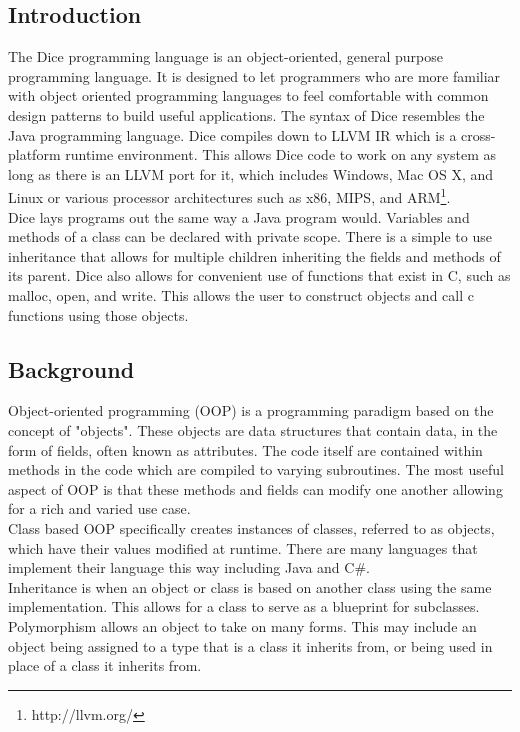 \begin{homeworkProblem}
	\chapter{Introduction}
	The Dice programming language is an object-oriented, general purpose programming language. It is designed to let programmers who are more familiar with object oriented programming languages to feel comfortable with common design patterns to build useful applications. The syntax of Dice resembles the Java programming language. Dice compiles down to LLVM IR which is a cross-platform runtime environment. This allows Dice code to work on any system as long as there is an LLVM port for it, which includes Windows, Mac OS X, and Linux or various processor architectures such as x86, MIPS, and ARM\footnote{http://llvm.org/}.\\
	
	Dice lays programs out the same way a Java program would. Variables and methods of a class can be declared with private scope. There is a simple to use inheritance that allows for multiple children inheriting the fields and methods of its parent. Dice also allows for convenient use of functions that exist in C, such as malloc, open, and write. This allows the user to construct objects and call c functions using those objects. 
	
	\section{Background}
	Object-oriented programming (OOP) is a programming paradigm based on the concept of "objects". These objects are data structures that contain data, in the form of fields, often known as attributes. The code itself are contained within methods in the code which are compiled to varying subroutines. The most useful aspect of OOP is that these methods and fields can modify one another allowing for a rich and varied use case. \\
	
	Class based OOP specifically creates instances of classes, referred to as objects, which have their values modified at runtime. There are many languages that implement their language this way including Java and C\#. \\
	
	Inheritance is when an object or class is based on another class using the same implementation. This allows for a class to serve as a blueprint for subclasses. Polymorphism allows an object to take on many forms. This may include an object being assigned to a type that is a class it inherits from, or being used in place of a class it inherits from. \\
	

\end{homeworkProblem}
